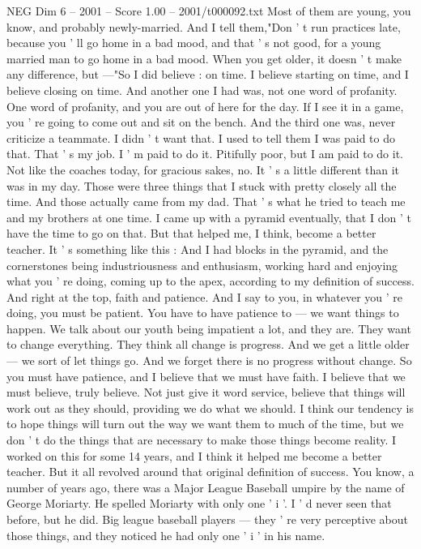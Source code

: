 \begin{textsample}{NEG Dim 6 – 2001 – Score 1.00 – 2001/t000092.txt}
Most of them are young, you know, and probably newly-married.
And I tell them,"Don ' t run practices late, because you ' ll go home in a bad mood, and that ' s not good, for a young married man to go home in a bad mood.
When you get older, it doesn ' t make any difference, but —"So I did believe : on time.
I believe starting on time, and I believe closing on time.
And another one I had was, not one word of profanity.
One word of profanity, and you are out of here for the day.
If I see it in a game, you ' re going to come out and sit on the bench.
And the third one was, never criticize a teammate.
I didn ' t want that.
I used to tell them I was paid to do that.
That ' s my job.
I ' m paid to do it.
Pitifully poor, but I am paid to do it.
Not like the coaches today, for gracious sakes, no.
It ' s a little different than it was in my day.
Those were three things that I stuck with pretty closely all the time.
And those actually came from my dad.
That ' s what he tried to teach me and my brothers at one time.
I came up with a pyramid eventually, that I don ' t have the time to go on that.
But that helped me, I think, become a better teacher.
It ' s something like this : And I had blocks in the pyramid, and the cornerstones being industriousness and enthusiasm, working hard and enjoying what you ' re doing, coming up to the apex, according to my definition of success.
And right at the top, faith and patience.
And I say to you, in whatever you ' re doing, you must be patient.
You have to have patience to — we want things to happen.
We talk about our youth being impatient a lot, and they are.
They want to change everything.
They think all change is progress.
And we get a little older — we sort of let things go.
And we forget there is no progress without change.
So you must have patience, and I believe that we must have faith.
I believe that we must believe, truly believe.
Not just give it word service, believe that things will work out as they should, providing we do what we should.
I think our tendency is to hope things will turn out the way we want them to much of the time, but we don ' t do the things that are necessary to make those things become reality.
I worked on this for some 14 years, and I think it helped me become a better teacher.
But it all revolved around that original definition of success.
You know, a number of years ago, there was a Major League Baseball umpire by the name of George Moriarty.
He spelled Moriarty with only one ' i '.
I ' d never seen that before, but he did.
Big league baseball players — they ' re very perceptive about those things, and they noticed he had only one ' i ' in his name.

\end{textsample}
